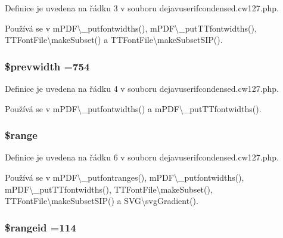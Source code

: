 Definice je uvedena na řádku 3 v souboru dejavuserifcondensed.\-cw127.\-php.



Používá se v m\-P\-D\-F\textbackslash{}\-\_\-putfontwidths(), m\-P\-D\-F\textbackslash{}\-\_\-put\-T\-Tfontwidths(), T\-T\-Font\-File\textbackslash{}make\-Subset() a T\-T\-Font\-File\textbackslash{}make\-Subset\-S\-I\-P().

\hypertarget{dejavuserifcondensed_8cw127_8php_afc01c27a4bb149f1386368eb7c57f324}{
\subsubsection[{\$prevwidth}]{\setlength{\rightskip}{0pt plus 5cm}\$prevwidth =754}}\label{dejavuserifcondensed_8cw127_8php_afc01c27a4bb149f1386368eb7c57f324}


Definice je uvedena na řádku 4 v souboru dejavuserifcondensed.\-cw127.\-php.



Používá se v m\-P\-D\-F\textbackslash{}\-\_\-putfontwidths() a m\-P\-D\-F\textbackslash{}\-\_\-put\-T\-Tfontwidths().

\hypertarget{dejavuserifcondensed_8cw127_8php_ac2e4b5fa63099d7c943a803ae122dd2b}{
\subsubsection[{\$range}]{\setlength{\rightskip}{0pt plus 5cm}\$range}}\label{dejavuserifcondensed_8cw127_8php_ac2e4b5fa63099d7c943a803ae122dd2b}


Definice je uvedena na řádku 6 v souboru dejavuserifcondensed.\-cw127.\-php.



Používá se v m\-P\-D\-F\textbackslash{}\-\_\-putfontranges(), m\-P\-D\-F\textbackslash{}\-\_\-putfontwidths(), m\-P\-D\-F\textbackslash{}\-\_\-put\-T\-Tfontwidths(), T\-T\-Font\-File\textbackslash{}make\-Subset(), T\-T\-Font\-File\textbackslash{}make\-Subset\-S\-I\-P() a S\-V\-G\textbackslash{}svg\-Gradient().

\hypertarget{dejavuserifcondensed_8cw127_8php_a555224809a2d03766193a06c6f4ea061}{
\subsubsection[{\$rangeid}]{\setlength{\rightskip}{0pt plus 5cm}\$rangeid =114}}\label{dejavuserifcondensed_8cw127_8php_a555224809a2d03766193a06c6f4ea061}


